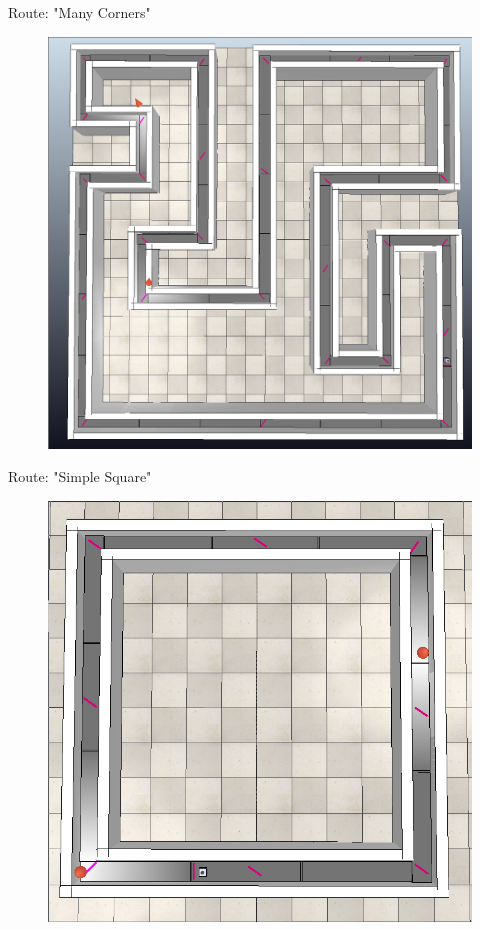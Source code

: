 \documentclass[10pt]{beamer}
\begin{document}
\begin{frame}{Route: "Many Corners"}
    \begin{figure}
        \centering
        \includegraphics[width=0.8\linewidth]{routes/many_corners.png}
    \end{figure}
\end{frame}

\begin{frame}{Route: "Simple Square"}
    \begin{figure}
        \centering
        \includegraphics[width=0.8\linewidth]{routes/simple_square.png}
    \end{figure}
\end{frame}
\end{document}
